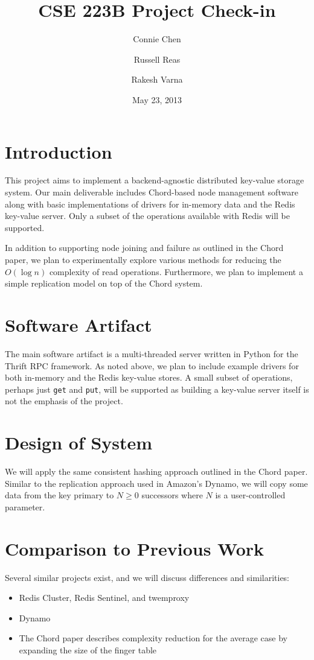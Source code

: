 \documentclass[12pt]{article}
\title{CSE 223B Project Check-in}
\author{Connie Chen \and Russell Reas \and Rakesh Varna}
\date{May 23, 2013}
\begin{document}
\maketitle

\section{Introduction}

This project aims to implement a backend-agnostic distributed key-value storage system. Our main deliverable includes Chord-based node management software along with basic implementations of drivers for in-memory data and the Redis key-value server. Only a subset of the operations available with Redis will be supported.

In addition to supporting node joining and failure as outlined in the Chord paper, we plan to experimentally explore various methods for reducing the $O(\log n)$ complexity of read operations. Furthermore, we plan to implement a simple replication model on top of the Chord system.

\section{Software Artifact}

The main software artifact is a multi-threaded server written in Python for the Thrift RPC framework. As noted above, we plan to include example drivers for both in-memory and the Redis key-value stores. A small subset of operations, perhaps just {\tt get} and {\tt put}, will be supported as building a key-value server itself is not the emphasis of the project. 

\section{Design of System}

We will apply the same consistent hashing approach outlined in the Chord paper. Similar to the replication approach used in Amazon's Dynamo, we will copy some data from the key primary to $N \ge 0$ successors where $N$ is a user-controlled parameter.

\section{Comparison to Previous Work}

Several similar projects exist, and we will discuss differences and similarities:
\begin{itemize}
\item Redis Cluster, Redis Sentinel, and twemproxy
\item Dynamo 
\item The Chord paper describes complexity reduction for the average case by expanding the size of the finger table
\end{itemize}
\end{document}
